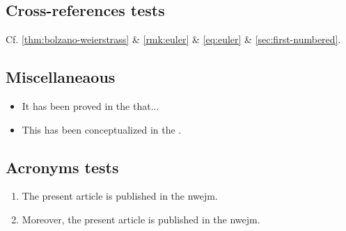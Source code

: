 \documentclass[
]{nwejmart}
\begin{document}
\subsection{Cross-references tests}
%
Cf. \vref{thm:bolzano-weierstrass} \& \vref{rmk:euler} \&
\vref{eq:euler} \& \vref{sec:first-numbered}.
%
\subsection{Miscellaneaous}
%
\begin{itemize}
\item It has been proved in the  
  that...
\item This has been conceptualized in the  .
\end{itemize}
%
\subsection{Acronyms tests}
%
\begin{enumerate}
\item The present article is published in the \gls{nwejm}.
\item Moreover, the present article is published in the \gls{nwejm}.
\end{enumerate}
%
\end{document}
